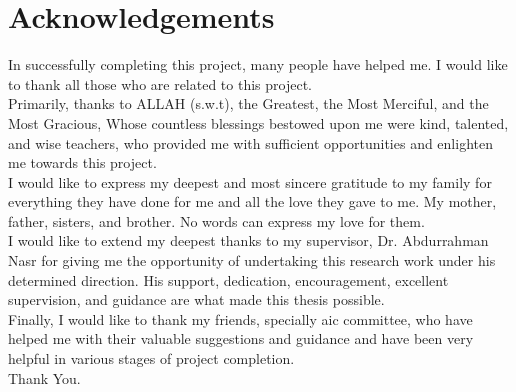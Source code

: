 \chapter*{Acknowledgements}

\noindent
In successfully completing this project, many people have helped me. I would like to thank all those who are related to this project. \\[4pt]
\noindent
Primarily, thanks to ALLAH (s.w.t), the Greatest, the Most Merciful, and the Most Gracious,
Whose countless blessings bestowed upon me were kind, talented, and wise teachers, who
provided me with sufficient opportunities and enlighten me towards this project. \\[4pt]
\noindent
I would like to express my deepest and most sincere gratitude to my family for everything they have done for me and all the love they gave to me. My mother, father, sisters, and brother. No words can express my love for them. \\[4pt]
\noindent
I would like to extend my deepest thanks to my supervisor, Dr. Abdurrahman Nasr for
giving me the opportunity of undertaking this research work under his determined
direction. His support, dedication, encouragement, excellent supervision, and guidance
are what made this thesis possible. \\[4pt]
\noindent
Finally, I would like to thank my friends, specially \acrfull{aic} committee, who have helped me with their valuable suggestions and guidance and have been very helpful in various stages of project completion. \\[16pt]
\noindent
Thank You.